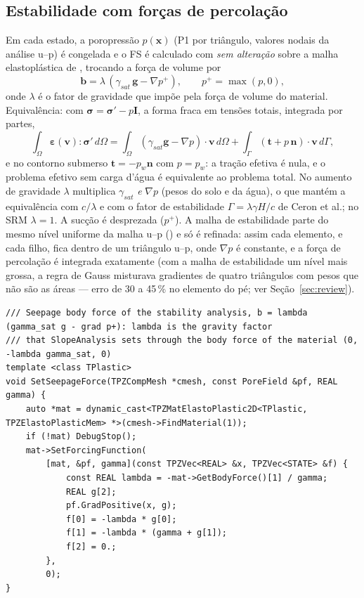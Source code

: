 \documentclass[11pt,a4paper]{article}
\newcommand{\cc}[1]{\texttt{\detokenize{#1}}} %
\newcommand{\sig}{\bm{\sigma}}
\newcommand{\eps}{\bm{\varepsilon}}
\begin{document}
\subsection{Estabilidade com forças de percolação}
Em cada estado, a poropressão $p(\mathbf x)$ (P1 por triângulo, valores nodais da análise u--p) é
congelada e o FS é calculado com  \emph{sem alteração} sobre a malha
elastoplástica de , trocando a força de volume por
\begin{equation}
\mathbf b = \lambda\,(\gamma_{sat}\,\mathbf g - \nabla p^+),\qquad p^+=\max(p,0),
\end{equation}
onde $\lambda$ é o fator de gravidade que  impõe pela força de volume do material.
Equivalência: com $\sig=\sig'-p\mathbf I$, a forma fraca em tensões totais, integrada por partes,
\begin{equation}
\int_\Omega \eps(\mathbf v):\sig'\,d\Omega = \int_\Omega(\gamma_{sat}\mathbf g-\nabla p)\cdot\mathbf v\,d\Omega
 + \int_\Gamma(\mathbf t+p\,\mathbf n)\cdot\mathbf v\,d\Gamma,
\end{equation}
e no contorno submerso $\mathbf t=-p_w\mathbf n$ com $p=p_w$: a tração efetiva é nula, e o problema
efetivo sem carga d'água é equivalente ao problema total. No aumento de gravidade $\lambda$ multiplica
$\gamma_{sat}$ \emph{e} $\nabla p$ (pesos do solo e da água), o que mantém a equivalência com $c/\lambda$
e com o fator de estabilidade $\Gamma=\lambda\gamma H/c$ de Ceron et al.; no SRM $\lambda=1$.
A sucção é desprezada ($p^+$). A malha de estabilidade parte do mesmo nível uniforme da malha u--p
() e só é refinada: assim cada elemento, e cada filho, fica dentro de um triângulo u--p,
onde $\nabla p$ é constante, e a força de percolação é integrada exatamente (com a malha de estabilidade
um nível mais grossa, a regra de Gauss misturava gradientes de quatro triângulos com pesos que não são
as áreas --- erro de 30 a 45\,\% no elemento do pé; ver Seção~\ref{sec:review}).

\begin{lstlisting}[caption={Força de volume de percolação para o \cc{SlopeAnalysis.h} inalterado.},label=lst:seep]
/// Seepage body force of the stability analysis, b = lambda (gamma_sat g - grad p+): lambda is the gravity factor
/// that SlopeAnalysis sets through the body force of the material (0, -lambda gamma_sat, 0)
template <class TPlastic>
void SetSeepageForce(TPZCompMesh *cmesh, const PoreField &pf, REAL gamma) {
    auto *mat = dynamic_cast<TPZMatElastoPlastic2D<TPlastic, TPZElastoPlasticMem> *>(cmesh->FindMaterial(1));
    if (!mat) DebugStop();
    mat->SetForcingFunction(
        [mat, &pf, gamma](const TPZVec<REAL> &x, TPZVec<STATE> &f) {
            const REAL lambda = -mat->GetBodyForce()[1] / gamma;
            REAL g[2];
            pf.GradPositive(x, g);
            f[0] = -lambda * g[0];
            f[1] = -lambda * (gamma + g[1]);
            f[2] = 0.;
        },
        0);
}
\end{lstlisting}
\end{document}
